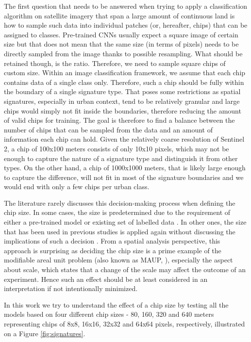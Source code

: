 The first question that needs to be answered when trying to apply a classification
algorithm on satellite imagery that span a large amount of continuous land is how
to sample such data into individual patches (or, hereafter, chips)
that can be assigned to classes. Pre-trained CNNs usually expect a square image of
certain size but that does not mean that the same size (in terms of pixels) needs to
be directly sampled from the image thanks to possible resampling. What should be
retained though, is the ratio. Therefore, we need to sample square chips of
custom size. Within an image classification framework, we assume that
each chip contains data of a single class only. Therefore, such a chip should be fully
within the boundary of a single signature type. That poses some restrictions as spatial
signatures, especially in urban context, tend to be relatively granular and large chips
would simply not fit inside the boundaries, therefore reducing the amount of
valid chips for training. The goal is therefore to find a balance
between the number of chips that can be sampled from the data and an amount of
information each chip can hold. Given the relatively coarse resolution of Sentinel 2, a
chip of 100x100 meters consists of only 10x10 pixels, which may not be enough to capture
the nature of a signature type and distinguish it from other types. On the other hand, a
chip of 1000x1000 meters, that is likely large enough to capture the difference, will
not fit in most of the signature boundaries and we would end with only a few chips per
urban class.

The literature rarely discusses this decision-making process when defining the chip
size. In some cases, the size is predetermined due to the requirement of either a
pre-trained model or existing set of labelled data \citep{taubenbock2020}. In
other ones, the size that has
been used in previous studies is applied again without discussing the implications
of such a decision \citep{wang2018mapping}. From a spatial analysis
perspective, this approach is surprising as deciding the chip size is a prime example of the
modifiable areal unit problem (also known as MAUP,
\citealp{openshaw1981modifiable}), especially the aspect about scale, which states that
a change of the scale may affect the outcome of an experiment. Hence such an effect
should be at least considered in an interpretation if not intentionally minimized.

In this work we try to understand the effect of a chip size by testing all the models
based on four different chip sizes - 80, 160, 320 and 640 meters representing chips of
8x8, 16x16, 32x32 and 64x64 pixels, respectively, illustrated on a Figure \ref{fig:signatures}.


